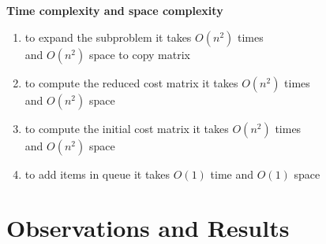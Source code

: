 \documentclass[12pt]{article}
\begin{document}
\newpage
\noindent\textbf{Time complexity and space complexity} \\
\begin{enumerate}
    \item to expand the subproblem it takes $O(n^2)$ times \\
    and $O(n^2)$ space to copy matrix
    \item to compute the reduced cost matrix it takes $O(n^2)$ times \\
    and $O(n^2)$ space
    \item to compute the initial cost matrix it takes $O(n^2)$ times \\
    and $O(n^2)$ space
    \item to add items in queue it takes $O(1)$ time and $O(1)$ space
\end{enumerate}

\newpage

\section{Observations and Results}
\end{document}
